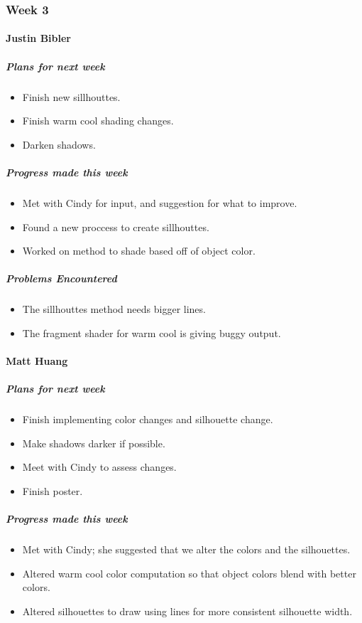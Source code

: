 {
\subsubsection{Week 3}
\paragraph{Justin Bibler}
\subparagraph{Plans for next week}
\begin{itemize}
  \item Finish new sillhouttes.
  \item Finish warm cool shading changes.
  \item Darken shadows.
\end{itemize}

\subparagraph{Progress made this week}
\begin{itemize}
  \item Met with Cindy for input, and suggestion for what to improve.
  \item Found a new proccess to create sillhouttes.
  \item Worked on method to shade based off of object color.
\end{itemize}

\subparagraph{Problems Encountered}
\begin{itemize}
  \item The sillhouttes method needs bigger lines.
  \item The fragment shader for warm cool is giving buggy output.
\end{itemize}
\vspace{3mm}

\paragraph{Matt Huang}
\subparagraph{Plans for next week}
\begin{itemize}
  \item Finish implementing color changes and silhouette change.
  \item Make shadows darker if possible.
  \item Meet with Cindy to assess changes.
  \item Finish poster.
\end{itemize}

\subparagraph{Progress made this week}
\begin{itemize}
  \item Met with Cindy; she suggested that we alter the colors and the silhouettes.
  \item Altered warm cool color computation so that object colors blend with better colors.
  \item Altered silhouettes to draw using lines for more consistent silhouette width.
\end{itemize}

}
